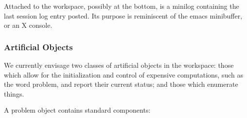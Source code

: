 Attached to the workspace, possibly at the bottom, is a minilog
containing the last session log entry posted. Its purpose is
reminiscent of the emacs minibuffer, or an X console.


\subsubsection{Artificial Objects}\label{Artificial_Objects}

We currently envisage two classes of artificial objects in the
workspace: those which allow for the initialization and control of
expensive computations, such as the word problem, and report their
current status; and those which enumerate things.




A problem object contains standard components:

